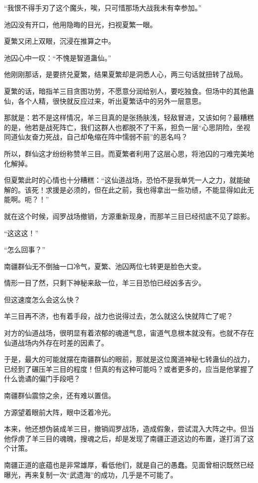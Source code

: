 \begin{this_body}
“我恨不得手刃了这个魔头，唉，只可惜那场大战我未有幸参加。”

池囚没有开口，他用隐晦的目光，扫视夏繁一眼。

夏繁又闭上双眼，沉浸在推算之中。

池囚心中一叹：“不愧是智道蛊仙。”

他刚刚那话，是要挤兑夏繁，结果夏繁却是洞悉人心，两三句话就扭转了战局。

夏繁的话，暗指羊三目贪图功劳，不愿意分润给别人，要吃独食。但场中的其他蛊仙，各个人精，很快就反应过来，听出夏繁话中的另外一层意思。

那就是：若不是这样情况，羊三目真的是张扬肤浅，轻敌冒进，又该如何？最糟糕的是，他若是战死阵亡，我们这群人也都脱不了干系，担负一层“心思阴险，坐视同道仙友奋力死战，自己却龟缩在阵中懦弱不前”的恶名吗？

所以，群仙这才纷纷称赞羊三目。而夏繁者利用了这层心思，将池囚的刁难完美地化解掉。

但夏繁此时的心情也十分糟糕：“这仙道战场，恐怕不是我单凭一人之力，就能破解的。该死！求援是必须的，但在此之前，我也得拿出一些功绩，不能显得如此无能啊。呃？！”

就在这个时候，阎罗战场撤销，方源重新现身，而那羊三目已经彻底不见了踪影。

“这这这！”

“怎么回事？”

南疆群仙无不倒抽一口冷气，夏繁、池囚两位七转更是脸色大变。

情形一目了然，只剩下神秘来敌一位，羊三目恐怕已经凶多吉少。

但这速度怎么会这么快？

羊三目再不济，也有着手段，战力也说得过去，怎么就这么快就阵亡了呢？

对方的仙道战场，很明显有着浓郁的魂道气息，宙道气息根本就没有。也就不存在仙道战场内外存在时差的因素了。

于是，最大的可能就摆在南疆群仙的眼前，那就是这位魔道神秘七转蛊仙的战力，已经到了碾压羊三目的程度！但真的有这种可能吗？或者更多的，应当是他掌握了什么诡谲的偏门手段吧？

南疆群仙震惊之余，还有难以置信。

方源望着眼前大阵，眼中泛着冷光。

本来，他还想伪装成羊三目，撤销阎罗战场，造成假象，尝试混入大阵之中。但当他俘虏了羊三目的魂魄，搜魂之后，却是发现了南疆正道这边的布置，遂打消了这个计策。

南疆正道的底蕴也是非常雄厚，看低他们，就是自己的愚蠢。见面曾相识既然已经曝光，再来复制一次“武遗海”的成功，几乎是不可能了。


\end{this_body}
